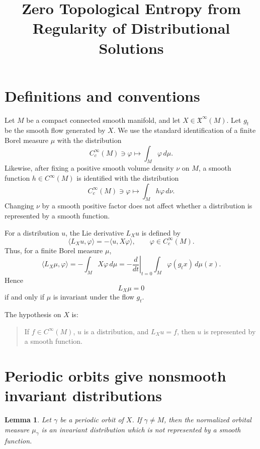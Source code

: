 \documentclass[11pt]{article}
\newtheorem{lemma}{Lemma}
\begin{document}
\title{Zero Topological Entropy from Regularity of Distributional Solutions}
\author{}
\date{}
\maketitle

\section{Definitions and conventions}

Let \(M\) be a compact connected smooth manifold, and let \(X\in \mathfrak X^\infty(M)\). Let \(g_t\) be the smooth flow generated by \(X\). We use the standard identification of a finite Borel measure \(\mu\) with the distribution
\[
C_c^\infty(M)\ni \varphi \longmapsto \int_M \varphi\,d\mu .
\]
Likewise, after fixing a positive smooth volume density \(\nu\) on \(M\), a smooth function \(h\in C^\infty(M)\) is identified with the distribution
\[
C_c^\infty(M)\ni \varphi \longmapsto \int_M h\varphi\,d\nu .
\]
Changing \(\nu\) by a smooth positive factor does not affect whether a distribution is represented by a smooth function.

For a distribution \(u\), the Lie derivative \(L_Xu\) is defined by
\[
\langle L_Xu,\varphi\rangle
=
-\langle u, X\varphi\rangle,
\qquad \varphi\in C_c^\infty(M).
\]
Thus, for a finite Borel measure \(\mu\),
\[
\langle L_X\mu,\varphi\rangle
=
-\int_M X\varphi\,d\mu
=
-\left.\frac{d}{dt}\right|_{t=0}\int_M \varphi(g_t x)\,d\mu(x).
\]
Hence
\[
L_X\mu=0
\]
if and only if \(\mu\) is invariant under the flow \(g_t\).

The hypothesis on \(X\) is:

\begin{quote}
If \(f\in C^\infty(M)\), \(u\) is a distribution, and \(L_Xu=f\), then \(u\) is represented by a smooth function.
\end{quote}

\section{Periodic orbits give nonsmooth invariant distributions}

\begin{lemma}
Let \(\gamma\) be a periodic orbit of \(X\). If \(\gamma\neq M\), then the normalized orbital measure \(\mu_\gamma\) is an invariant distribution which is not represented by a smooth function.
\end{lemma}
\end{document}
